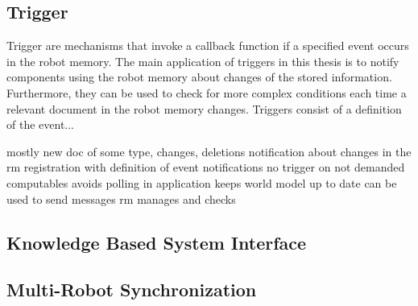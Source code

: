 {\subsection{Trigger}
Trigger are mechanisms that invoke a callback function if a specified
event occurs in the robot memory. The main application of triggers in
this thesis is to notify components using the robot memory about
changes of the stored information. Furthermore, they can be used to
check for more complex conditions each time a relevant document in the
robot memory changes. Triggers consist of a definition of the event...

mostly new doc of some type, changes, deletions
notification about changes in the rm
registration with definition of event
notifications
no trigger on not demanded computables
avoids polling in application
keeps world model up to date
can be used to send messages
rm manages and checks

\subsection{Knowledge Based System Interface}
\subsection{Multi-Robot Synchronization}

}
